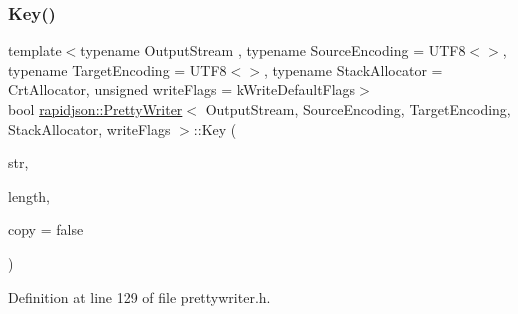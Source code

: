 \subsubsection{\texorpdfstring{Key()}{Key()}\hspace{0.1cm}{\footnotesize\ttfamily [1/2]}}
{\footnotesize\ttfamily template$<$typename Output\+Stream , typename Source\+Encoding  = U\+T\+F8$<$$>$, typename Target\+Encoding  = U\+T\+F8$<$$>$, typename Stack\+Allocator  = Crt\+Allocator, unsigned write\+Flags = k\+Write\+Default\+Flags$>$ \\
bool \mbox{\hyperlink{classrapidjson_1_1_pretty_writer}{rapidjson\+::\+Pretty\+Writer}}$<$ Output\+Stream, Source\+Encoding, Target\+Encoding, Stack\+Allocator, write\+Flags $>$\+::Key (\begin{DoxyParamCaption}\item[{const \mbox{\hyperlink{classrapidjson_1_1_pretty_writer_a74a38902073aa599c8bcc6a3ca6126d0}{Ch}} $\ast$}]{str,  }\item[{\mbox{\hyperlink{namespacerapidjson_a44eb33eaa523e36d466b1ced64b85c84}{Size\+Type}}}]{length,  }\item[{bool}]{copy = {\ttfamily false} }\end{DoxyParamCaption})}



Definition at line 129 of file prettywriter.\+h.


\begin{DoxyCode}{0}

\end{DoxyCode}
\mbox{\label{classrapidjson_1_1_pretty_writer_a0b7000c10be5b1e24920ce27a7ba7f6a}} 
